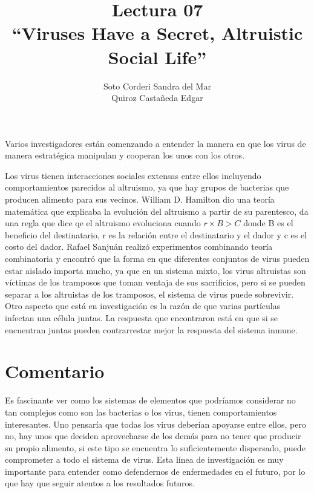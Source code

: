 \documentclass[12pt, letterpaper]{article}
\title{
    Lectura 07\\ 
    ``Viruses Have a Secret, Altruistic Social Life''
}
\author{
    Soto Corderi Sandra del Mar\\
    Quiroz Castañeda Edgar \\
}
\begin{document}
    \maketitle
    
    Varios investigadores están comenzando a entender la manera en que los virus de manera estratégica manipulan y cooperan los unos con los otros.
    
    Los virus tienen interacciones sociales extensas entre ellos incluyendo comportamientos parecidos al altruismo, ya que hay grupos de bacterias que producen alimento para sus vecinos. William D. Hamilton dio una teoría matemática que explicaba la evolución del altruismo a partir de su parentesco, da una regla que dice qe el altruismo evoluciona cuando $r \times B > C$ donde B es el beneficio del destinatario, r es la relación entre el destinatario y el dador y c es el costo del dador.
    Rafael Sanjuán realizó experimentos combinando teoría combinatoria y encontró que la forma en que diferentes conjuntos de virus pueden estar aislado importa mucho, ya que en un sistema mixto, los virus altruistas son víctimas de los tramposos que toman ventaja de sus sacrificios, pero si se pueden separar a los altruistas de los tramposos, el sistema de virus puede sobrevivir.
    Otro aspecto que está en investigación es la razón de que varias partículas infectan una célula juntas. La respuesta que encontraron está en que si se encuentran juntas pueden contrarrestar mejor la respuesta del sistema inmune.
    
    
    \section*{Comentario}
    
    Es fascinante ver como los sistemas de elementos que podríamos considerar no tan complejos como son las bacterias o los virus, tienen comportamientos interesantes. Uno pensaría que todas los virus deberían apoyarse entre ellos, pero no, hay unos que deciden aprovecharse de los demás para no tener que producir su propio alimento, si este tipo se encuentra lo suficientemente dispersado, puede comprometer a todo el sistema de virus.
    Esta línea de investigación es muy importante para entender como defendernos de enfermedades en el futuro, por lo que hay que seguir atentos a los resultados futuros.
\end{document}
